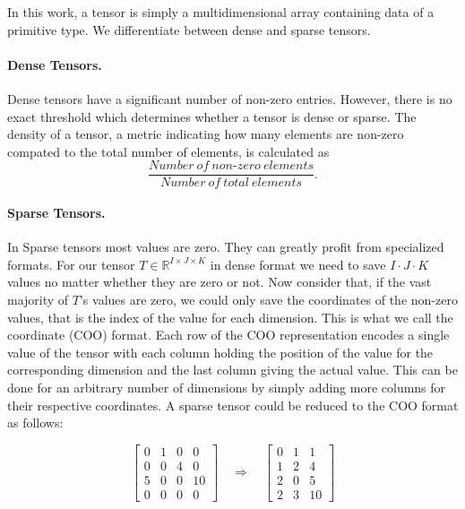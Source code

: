 \noindent
In this work, a tensor is simply a multidimensional array containing data of a
primitive type. We differentiate between dense and sparse tensors.

\paragraph{Dense Tensors.}
Dense tensors have a significant number of non-zero entries. However, there is no
exact threshold which determines whether a tensor is dense or sparse. The density
of a tensor, a metric indicating how many elements are non-zero compated to the total
number of elements, is calculated as
\begin{equation*}
    \frac{Number\ of\ non\text{-}zero\ elements}{Number\ of\ total\ elements}.
\end{equation*}

\paragraph{Sparse Tensors.}
In Sparse tensors most values are zero. They can greatly profit from specialized
formats. For our tensor $T \in \mathbb{R}^{I \times J \times K}$ in dense format
we need to save $I \cdot J \cdot K$ values no matter whether they are zero or not.
Now consider that, if the vast majority of $T$'s values are zero, we could only save
the coordinates of the non-zero values, that is the index of the value for each
dimension. This is what we call the coordinate (COO) format. Each row of the COO
representation encodes a single value of the tensor with each column holding the
position of the value for the corresponding dimension and the last column giving
the actual value. This can be done for an arbitrary number of dimensions by simply
adding more columns for their respective coordinates. A sparse tensor could be
reduced to the COO format as follows:

\begin{equation*}
    \begin{bmatrix}
        0 & 1 & 0 & 0  \\
        0 & 0 & 4 & 0  \\
        5 & 0 & 0 & 10 \\
        0 & 0 & 0 & 0
    \end{bmatrix}
    \quad
    \Rightarrow
    \quad
    \begin{bmatrix}
        0 & 1 & 1  \\
        1 & 2 & 4  \\
        2 & 0 & 5  \\
        2 & 3 & 10
    \end{bmatrix}
\end{equation*}

